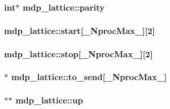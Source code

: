 \hypertarget{classmdp__lattice_a1509bce18be50d1cdaf23bfb13161782}{
\subsubsection[{parity}]{\setlength{\rightskip}{0pt plus 5cm}int$\ast$ {\bf mdp\_\-lattice::parity}}}
\label{classmdp__lattice_a1509bce18be50d1cdaf23bfb13161782}
\hypertarget{classmdp__lattice_a63f2a78da171f663b3f038e83192c7e8}{
\subsubsection[{start}]{ {\bf mdp\_\-lattice::start}\mbox{[}{\bf \_\-NprocMax\_\-}\mbox{]}\mbox{[}2\mbox{]}}}
\label{classmdp__lattice_a63f2a78da171f663b3f038e83192c7e8}
\hypertarget{classmdp__lattice_a34b18f8769d018df30110723799a078d}{
\subsubsection[{stop}]{ {\bf mdp\_\-lattice::stop}\mbox{[}{\bf \_\-NprocMax\_\-}\mbox{]}\mbox{[}2\mbox{]}}}
\label{classmdp__lattice_a34b18f8769d018df30110723799a078d}
\hypertarget{classmdp__lattice_ad3ad7c17679cd144673f6abb9b7201ec}{
\subsubsection[{to\_\-send}]{$\ast$ {\bf mdp\_\-lattice::to\_\-send}\mbox{[}{\bf \_\-NprocMax\_\-}\mbox{]}}}
\label{classmdp__lattice_ad3ad7c17679cd144673f6abb9b7201ec}
\hypertarget{classmdp__lattice_a14892e721f56e142037c511bf6543e8d}{
\subsubsection[{up}]{$\ast$$\ast$ {\bf mdp\_\-lattice::up}}}
